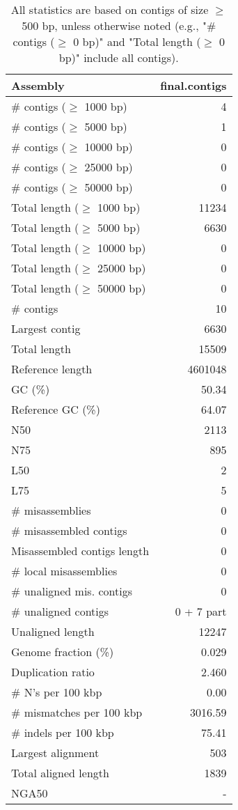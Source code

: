 \documentclass[12pt,a4paper]{article}
\begin{document}
\begin{table}[ht]
\begin{center}
\caption{All statistics are based on contigs of size $\geq$ 500 bp, unless otherwise noted (e.g., "\# contigs ($\geq$ 0 bp)" and "Total length ($\geq$ 0 bp)" include all contigs).}
\begin{tabular}{|l*{1}{|r}|}
\hline
Assembly & final.contigs \\ \hline
\# contigs ($\geq$ 1000 bp) & 4 \\ \hline
\# contigs ($\geq$ 5000 bp) & 1 \\ \hline
\# contigs ($\geq$ 10000 bp) & 0 \\ \hline
\# contigs ($\geq$ 25000 bp) & 0 \\ \hline
\# contigs ($\geq$ 50000 bp) & 0 \\ \hline
Total length ($\geq$ 1000 bp) & 11234 \\ \hline
Total length ($\geq$ 5000 bp) & 6630 \\ \hline
Total length ($\geq$ 10000 bp) & 0 \\ \hline
Total length ($\geq$ 25000 bp) & 0 \\ \hline
Total length ($\geq$ 50000 bp) & 0 \\ \hline
\# contigs & 10 \\ \hline
Largest contig & 6630 \\ \hline
Total length & 15509 \\ \hline
Reference length & 4601048 \\ \hline
GC (\%) & 50.34 \\ \hline
Reference GC (\%) & 64.07 \\ \hline
N50 & 2113 \\ \hline
N75 & 895 \\ \hline
L50 & 2 \\ \hline
L75 & 5 \\ \hline
\# misassemblies & 0 \\ \hline
\# misassembled contigs & 0 \\ \hline
Misassembled contigs length & 0 \\ \hline
\# local misassemblies & 0 \\ \hline
\# unaligned mis. contigs & 0 \\ \hline
\# unaligned contigs & 0 + 7 part \\ \hline
Unaligned length & 12247 \\ \hline
Genome fraction (\%) & 0.029 \\ \hline
Duplication ratio & 2.460 \\ \hline
\# N's per 100 kbp & 0.00 \\ \hline
\# mismatches per 100 kbp & 3016.59 \\ \hline
\# indels per 100 kbp & 75.41 \\ \hline
Largest alignment & 503 \\ \hline
Total aligned length & 1839 \\ \hline
NGA50 & - \\ \hline
\end{tabular}
\end{center}
\end{table}
\end{document}

